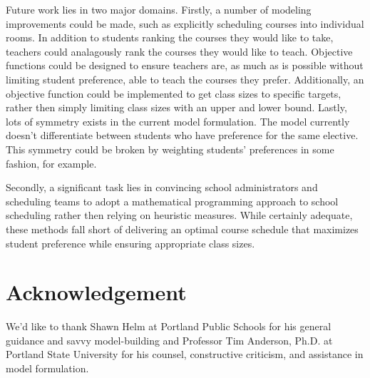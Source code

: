 \documentclass[12pt]{article}
\begin{document}
Future work lies in two major domains. Firstly, a number of modeling improvements could be made, such as explicitly scheduling courses into individual rooms. In addition to students ranking the courses they would like to take, teachers could analagously rank the courses they would like to teach. Objective functions could be designed to ensure teachers are, as much as is possible without limiting student preference, able to teach the courses they prefer. Additionally, an objective function could be implemented to get class sizes to specific targets, rather then simply limiting class sizes with an upper and lower bound. Lastly, lots of symmetry exists in the current model formulation. The model currently doesn't differentiate between students who have preference for the same elective. This symmetry could be broken by weighting students' preferences in some fashion, for example.

Secondly, a significant task lies in convincing school administrators and scheduling teams to adopt a mathematical programming approach to school scheduling rather then relying on heuristic measures. While certainly adequate, these methods fall short of delivering an optimal course schedule that maximizes student preference while ensuring appropriate class sizes.

\section*{Acknowledgement}

We'd like to thank Shawn Helm at Portland Public Schools for his general guidance and savvy model-building and Professor Tim Anderson, Ph.D. at Portland State University for his counsel, constructive criticism, and assistance in model formulation.



\end{document}
